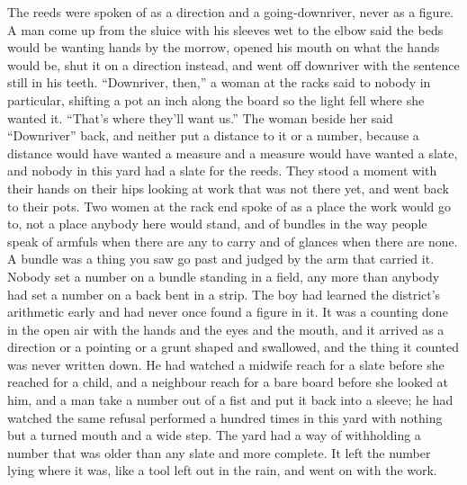 The reeds were spoken of as a direction and a going-downriver, never as a figure. A man come up from the sluice with his sleeves wet to the elbow said the beds would be wanting hands by the morrow, opened his mouth on what the hands would be, shut it on a direction instead, and went off downriver with the sentence still in his teeth. “Downriver, then,” a woman at the racks said to nobody in particular, shifting a pot an inch along the board so the light fell where she wanted it. “That's where they'll want us.” The woman beside her said “Downriver” back, and neither put a distance to it or a number, because a distance would have wanted a measure and a measure would have wanted a slate, and nobody in this yard had a slate for the reeds. They stood a moment with their hands on their hips looking at work that was not there yet, and went back to their pots. Two women at the rack end spoke of  as a place the work would go to, not a place anybody here would stand, and of bundles in the way people speak of armfuls when there are any to carry and of glances when there are none. A bundle was a thing you saw go past and judged by the arm that carried it. Nobody set a number on a bundle standing in a field, any more than anybody had set a number on a back bent in a strip. The boy had learned the district's arithmetic early and had never once found a figure in it. It was a counting done in the open air with the hands and the eyes and the mouth, and it arrived as a direction or a pointing or a grunt shaped and swallowed, and the thing it counted was never written down. He had watched a midwife reach for a slate before she reached for a child, and a neighbour reach for a bare board before she looked at him, and a man take a number out of a fist and put it back into a sleeve; he had watched the same refusal performed a hundred times in this yard with nothing but a turned mouth and a wide step. The yard had a way of withholding a number that was older than any slate and more complete. It left the number lying where it was, like a tool left out in the rain, and went on with the work.


